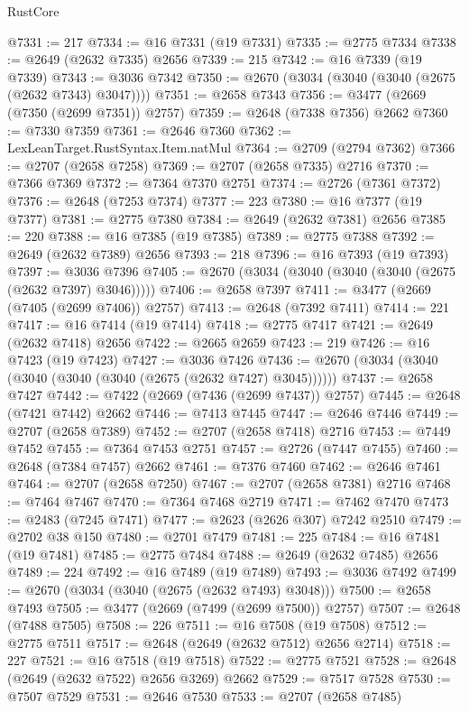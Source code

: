 \begin{lexlean}{RustCore}
\begin{coremodule}
@7331 := 217
@7334 := @16 @7331 (@19 @7331)
@7335 := @2775 @7334
@7338 := @2649 (@2632 @7335) @2656
@7339 := 215
@7342 := @16 @7339 (@19 @7339)
@7343 := @3036 @7342
@7350 := @2670 (@3034 (@3040 (@3040 (@2675 (@2632 @7343) @3047))))
@7351 := @2658 @7343
@7356 := @3477 (@2669 (@7350 (@2699 @7351)) @2757)
@7359 := @2648 (@7338 @7356) @2662
@7360 := @7330 @7359
@7361 := @2646 @7360
@7362 := LexLeanTarget.RustSyntax.Item.natMul
@7364 := @2709 (@2794 @7362)
@7366 := @2707 (@2658 @7258)
@7369 := @2707 (@2658 @7335) @2716
@7370 := @7366 @7369
@7372 := @7364 @7370 @2751
@7374 := @2726 (@7361 @7372)
@7376 := @2648 (@7253 @7374)
@7377 := 223
@7380 := @16 @7377 (@19 @7377)
@7381 := @2775 @7380
@7384 := @2649 (@2632 @7381) @2656
@7385 := 220
@7388 := @16 @7385 (@19 @7385)
@7389 := @2775 @7388
@7392 := @2649 (@2632 @7389) @2656
@7393 := 218
@7396 := @16 @7393 (@19 @7393)
@7397 := @3036 @7396
@7405 := @2670 (@3034 (@3040 (@3040 (@3040 (@2675 (@2632 @7397) @3046)))))
@7406 := @2658 @7397
@7411 := @3477 (@2669 (@7405 (@2699 @7406)) @2757)
@7413 := @2648 (@7392 @7411)
@7414 := 221
@7417 := @16 @7414 (@19 @7414)
@7418 := @2775 @7417
@7421 := @2649 (@2632 @7418) @2656
@7422 := @2665 @2659
@7423 := 219
@7426 := @16 @7423 (@19 @7423)
@7427 := @3036 @7426
@7436 := @2670 (@3034 (@3040 (@3040 (@3040 (@3040 (@2675 (@2632 @7427) @3045))))))
@7437 := @2658 @7427
@7442 := @7422 (@2669 (@7436 (@2699 @7437)) @2757)
@7445 := @2648 (@7421 @7442) @2662
@7446 := @7413 @7445
@7447 := @2646 @7446
@7449 := @2707 (@2658 @7389)
@7452 := @2707 (@2658 @7418) @2716
@7453 := @7449 @7452
@7455 := @7364 @7453 @2751
@7457 := @2726 (@7447 @7455)
@7460 := @2648 (@7384 @7457) @2662
@7461 := @7376 @7460
@7462 := @2646 @7461
@7464 := @2707 (@2658 @7250)
@7467 := @2707 (@2658 @7381) @2716
@7468 := @7464 @7467
@7470 := @7364 @7468 @2719
@7471 := @7462 @7470
@7473 := @2483 (@7245 @7471)
@7477 := @2623 (@2626 @307) @7242 @2510
@7479 := @2702 @38 @150
@7480 := @2701 @7479
@7481 := 225
@7484 := @16 @7481 (@19 @7481)
@7485 := @2775 @7484
@7488 := @2649 (@2632 @7485) @2656
@7489 := 224
@7492 := @16 @7489 (@19 @7489)
@7493 := @3036 @7492
@7499 := @2670 (@3034 (@3040 (@2675 (@2632 @7493) @3048)))
@7500 := @2658 @7493
@7505 := @3477 (@2669 (@7499 (@2699 @7500)) @2757)
@7507 := @2648 (@7488 @7505)
@7508 := 226
@7511 := @16 @7508 (@19 @7508)
@7512 := @2775 @7511
@7517 := @2648 (@2649 (@2632 @7512) @2656 @2714)
@7518 := 227
@7521 := @16 @7518 (@19 @7518)
@7522 := @2775 @7521
@7528 := @2648 (@2649 (@2632 @7522) @2656 @3269) @2662
@7529 := @7517 @7528
@7530 := @7507 @7529
@7531 := @2646 @7530
@7533 := @2707 (@2658 @7485)

\end{coremodule}
\end{lexlean}
